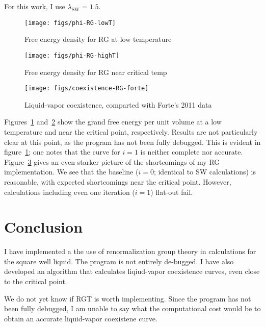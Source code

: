 \documentclass[letterpaper,twocolumn,amsmath,amssymb,prb]{revtex4-1}
\newcommand{\lambdaSW}{\ensuremath{\lambda_\text{SW}}}
\newcommand{\1}{\ensuremath{\textbf{r}_1}}
\newcommand{\2}{\ensuremath{\textbf{r}_2}}
\newcommand{\3}{\ensuremath{\textbf{r}_3}}
\newcommand{\4}{\ensuremath{\textbf{r}_4}}
\begin{document}
For this work, I use $\lambdaSW = 1.5$.

\begin{figure}
  \begin{center}
  \texttt{[image: figs/phi-RG-lowT]}
  \end{center}
  \caption{Free energy density for RG at low temperature}
  \label{fig:phi-RG-lowT}
\end{figure}

\begin{figure}
  \begin{center}
  \texttt{[image: figs/phi-RG-highT]}
  \end{center}
  \caption{Free energy density for RG near critical temp}
  \label{fig:phi-RG-highT}
\end{figure}

\begin{figure}
  \begin{center}
  \texttt{[image: figs/coexistence-RG-forte]}
  \end{center}
  \caption{Liquid-vapor coexistence, comparted with Forte's 2011 data}
  \label{fig:coexistence-RG-forte}
\end{figure}

Figures~\ref{fig:phi-RG-lowT} and~\ref{fig:phi-RG-highT} show the
grand free energy per unit volume at a low temperature and near the
critical point, respectively. Results are not particularly clear at
this point, as the program has not been fully debugged. This is
evident in figure~\ref{fig:phi-RG-lowT}; one notes that the curve for
$i=1$ is neither complete nor
accurate. Figure~\ref{fig:coexistence-RG-forte} gives an even starker
picture of the shortcomings of my RG implementation. We see that the
baseline ($i=0$; identical to SW calculations) is reasonable, with
expected shortcomings near the critical point. However, calculations
including even one iteration ($i=1$) flat-out fail.


\section{Conclusion}\label{sec:conclusion}

I have implemented a the use of renormalization group theory in
calculations for the square well liquid. The program is not entirely
de-bugged. I have also developed an algorithm that calculates
liqiud-vapor coexistence curves, even close to the critical point.

We do not yet know if RGT is worth implementing. Since the program has
not been fully debugged, I am unable to say what the computational
cost would be to obtain an accurate liquid-vapor coexistene curve.


\end{document}
